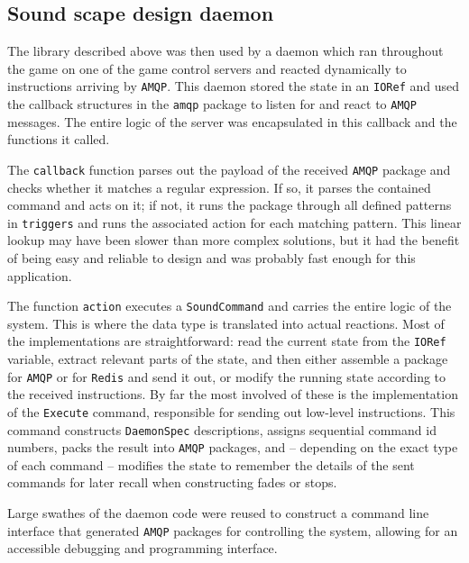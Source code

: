 \subsection{Sound scape design daemon}
\label{sec:sound-scape-design}

The library described above was then used by a daemon which ran
throughout the game on one of the game control servers and reacted
dynamically to instructions arriving by \texttt{AMQP}. This daemon stored
the state in an
\texttt{IORef} and used the
callback structures in the \texttt{amqp} package to listen for and
react to \texttt{AMQP} messages. The entire logic of the server was encapsulated
in this callback and the functions it called.

The \texttt{callback} function parses out the payload of the received \texttt{AMQP}
package and checks whether it matches a regular expression. If so, it parses the contained command and acts on it; if not, it runs
the package through all defined patterns in \texttt{triggers} and runs
the associated action for each matching pattern. This linear lookup
may have been slower than more complex solutions, but it had the benefit
of being easy and reliable to design and was probably fast
enough for this application. 

The function \texttt{action} executes a \texttt{SoundCommand} and
carries the entire logic of the system. This is where the data type is
translated into actual reactions. Most of the implementations are
straightforward: read the current state from the \texttt{IORef}
variable, extract relevant parts of the state, and then either assemble a package for
\texttt{AMQP} or for \texttt{Redis} and send it out, or modify the running state
according to the received instructions. By far the most involved of
these is the implementation of the \texttt{Execute} command,
responsible for sending out low-level instructions. This command constructs
\texttt{DaemonSpec} descriptions, assigns sequential command id
numbers, packs the result into \texttt{AMQP} packages, and -- depending on the
exact type of each command -- modifies the state to remember the details
of the sent commands for later recall when constructing fades or
stops.

Large swathes of the daemon code were reused to construct a command
line interface that generated \texttt{AMQP} packages for controlling the
system, allowing for an accessible debugging and programming interface.



